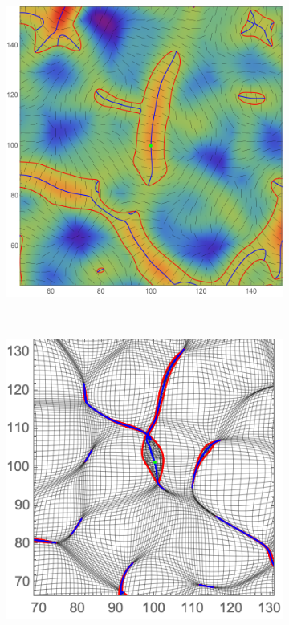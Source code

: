 \documentclass[a4paper, 11pt]{article}
\begin{document}
\begin{figure}
\centering
\begin{subfigure}[b]{0.4\textwidth}
\includegraphics[width=\textwidth]{Rotation_L_1}
\end{subfigure}~
\begin{subfigure}[b]{0.4\textwidth}
\includegraphics[width=\textwidth]{Rotation_Z_1}

\end{subfigure}
\end{figure}
\end{document}
